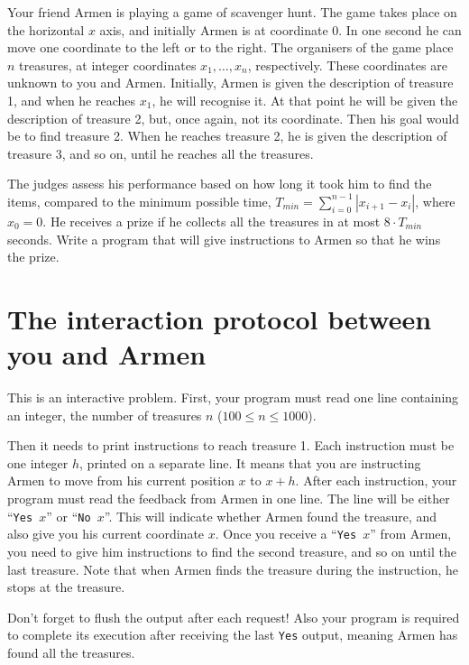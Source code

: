 
Your friend Armen is playing a game of scavenger hunt.
The game takes place on the horizontal $x$ axis, and initially Armen is at coordinate $0$.
In one second he can move one coordinate to the left or to the right.
The organisers of the game place $n$ treasures, at integer coordinates $x_1,\dots, x_n$, respectively.
These coordinates are unknown to you and Armen.
Initially, Armen is given the description of treasure 1, and when he reaches $x_1$, he will recognise it.
At that point he will be given the description of treasure 2, but, once again, not its coordinate.
Then his goal would be to find treasure 2.
When he reaches treasure 2, he is given the description of treasure 3, and so on, until he reaches all the treasures.

The judges assess his performance based on how long it took him to find the items, compared to the minimum possible time, $T_{min} = \sum_{i = 0}^{n-1}|x_{i + 1} - x_i|$, where $x_0 = 0$.
He receives a prize if he collects all the treasures in at most $8 \cdot T_{min}$ seconds.
Write a program that will give instructions to Armen so that he wins the prize.

\section*{The interaction protocol between you and Armen}
This is an interactive problem.
First, your program must read one line containing an integer, the number of treasures $n$ ($100 \leq n \leq 1000$).

Then it needs to print instructions to reach treasure 1.
Each instruction must be one integer $h$, printed on a separate line.
It means that you are instructing Armen to move from his current position $x$ to $x + h$.
After each instruction, your program must read the feedback from Armen in one line.
The line will be either ``\texttt{Yes }$x$'' or ``\texttt{No }$x$''.
This will indicate whether Armen found the treasure, and also give you his current coordinate $x$.
Once you receive a ``\texttt{Yes }$x$'' from Armen, you need to give him instructions to find the second treasure, and so on until the last treasure.
Note that when Armen finds the treasure during the instruction, he stops at the treasure.

Don’t forget to flush the output after each request!
Also your program is required to complete its execution after receiving the last \texttt{Yes} output, meaning Armen has found all the treasures.

